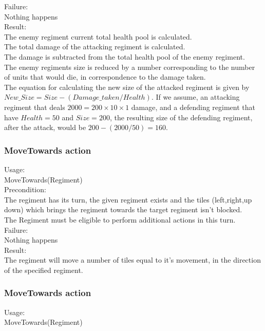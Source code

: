 		Failure: \\
		Nothing happens \\
		
		Result: \\
		The enemy regiment current total health pool is calculated.\\ 
		The total damage of the attacking regiment is calculated. \\
		The damage is subtracted from the total health pool of the enemy regiment.\\
		The enemy regiments size is reduced by a number corresponding to the number of units that would die, in correspondence to the damage taken.\\
		The equation for calculating the new size of the attacked regiment is given by \\
		$New\_Size = Size - (Damage\_taken / Health)$.
		If we assume, an attacking regiment that deals $2000 = 200 \times 10 \times 1$ damage, and a defending regiment that have $Health = 50$ and $Size = 200$, the resulting size of the defending regiment, after the attack, would be $200-(2000/50)=160$.
		
		\subsubsection{MoveTowards action}
		Usage: \\
		MoveTowards(Regiment) \\
		
		Precondition: \\
		The regiment has its turn, the given regiment exists and the tiles (left,right,up down) 
		which brings the regiment towards the target regiment isn't blocked.\\
		The Regiment must be eligible to perform additional actions in this turn.\\
		
		Failure: \\
		Nothing happens \\
		
		Result: \\
		The regiment will move a number of tiles equal to it's movement, in the direction of the specified regiment.
		
		\subsubsection{MoveTowards action}
		Usage: \\
		MoveTowards(Regiment) \\
		
